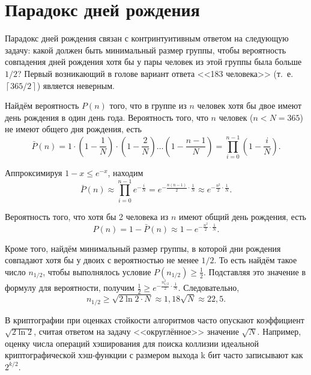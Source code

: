 \section{Парадокс дней рождения}\label{section-birthday-padradox}

Парадокс дней рождения связан с контринтуитивным ответом на следующую задачу: какой должен быть минимальный размер группы, чтобы вероятность совпадения дней рождения хотя бы у пары человек из этой группы была больше $1 / 2$? Первый возникающий в голове вариант ответа <<183 человека>> (т.~е. $\left\lceil 365 / 2 \right\rceil$) является неверным.

Найдём вероятность $P(n)$ того, что в группе из $n$ человек хотя бы двое имеют день рождения в один день года. Вероятность того, что $n$ человек ($n < N = 365$) не имеют общего дня рождения, есть
\[
    \bar{P}(n) = 1 \cdot \left( 1 - \frac{1}{N} \right) \cdot \left(1 - \frac{2}{N} \right)  \dots  \left( 1 - \frac{n-1}{N} \right) = \prod\limits_{i=0}^{n-1} \left( 1 - \frac{i}{N} \right).
\]

Аппроксимируя $1-x \leq e^{-x}$, находим
    \[ \bar{P}(n) \approx \prod\limits_{i=0}^{n-1} e^{-\frac{i}{N}} = e^{-\frac{n(n-1)}{2} \cdot \frac{1}{N}} \approx e^{-\frac{n^2}{2} \cdot \frac{1}{N}}. \]

Вероятность того, что хотя бы 2 человека из $n$ имеют общий день рождения, есть
    \[ P(n) = 1 - \bar{P}(n) \approx 1 -  e^{-\frac{n^2}{2} \cdot \frac{1}{N}}. \]

Кроме того, найдём минимальный размер группы, в которой дни рождения совпадают хотя бы у двоих с вероятностью не менее $1/2$. То есть найдём такое число $n_{1/2}$, чтобы выполнялось условие $P(n_{1/2}) \geq \frac{1}{2}$. Подставляя это значение в формулу для вероятности, получим $\frac{1}{2} \geq e^{-\frac{n_{1/2}^2}{2} \cdot \frac{1}{N}}$. Следовательно,
	\[n_{1/2} \geq \sqrt{2 \ln 2 \cdot N} \approx 1,18 \sqrt{ N } \approx 22,5.\]

В криптографии при оценках стойкости алгоритмов часто опускают коэффициент $\sqrt{2 \ln 2}$, считая ответом на задачу <<округлённое>> значение $\sqrt{ N }$. Например, оценку числа операций хэширования для поиска коллизии идеальной криптографической хэш-функции с размером выхода k бит часто записывают как $2^{k/2}$.
